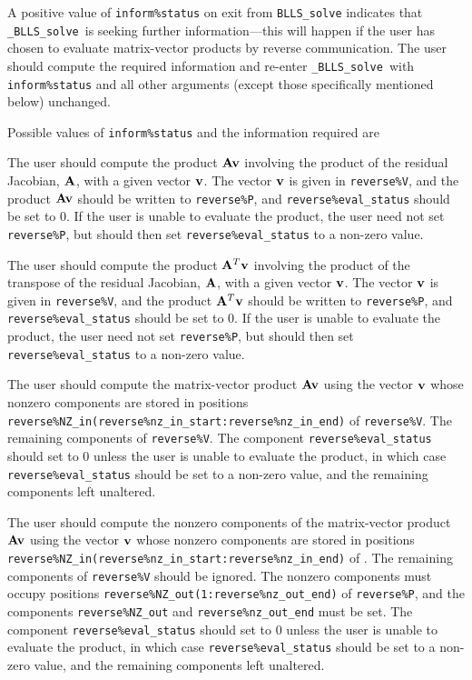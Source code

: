 \documentclass{galahad}
\newcommand{\packagename}{BLLS}
\newcommand{\fullpackagename}{\libraryname\_\packagename}
\newcommand{\solver}{{\tt \fullpackagename\_solve}}
\begin{document}
A positive value of {\tt inform\%status} on exit from
{\tt \packagename\_solve}
indicates that
\solver\ is seeking further information---this will happen
if the user has chosen to evaluate matrix-vector products by
reverse communication.
The user should compute the required information and re-enter \solver\
with {\tt inform\%status} and all other arguments (except those specifically
mentioned below) unchanged.

Possible values of {\tt inform\%status} and the information required are
\begin{description}

 The user should compute the product ${\mathbf{A}} {\mathbf{v}}$
     involving the product of the residual Jacobian, ${\mathbf{A}}$,
     with a given vector ${\mathbf{v}}$.
     The vector ${\mathbf{v}}$ is given in {\tt reverse\%V}, and the
     product ${\mathbf{A}} {\mathbf{v}}$ should be written to {\tt reverse\%P},
     and  {\tt reverse\%eval\_status} should be set to 0.
     If the user is unable to evaluate the product,
     the user need not set {\tt reverse\%P}, but
     should then set {\tt reverse\%eval\_status} to a non-zero value.

 The user should compute the product ${\mathbf{A}}^T {\mathbf{v}}$
     involving the product of the transpose of the residual
     Jacobian, ${\mathbf{A}}$,  with a given vector ${\mathbf{v}}$.
     The vector ${\mathbf{v}}$ is given in {\tt reverse\%V}, and the
     product ${\mathbf{A}}^T {\mathbf{v}}$ should be written to {\tt reverse\%P},
     and  {\tt reverse\%eval\_status} should be set to 0.
     If the user is unable to evaluate the product,
     the user need not set {\tt reverse\%P}, but
     should then set {\tt reverse\%eval\_status} to a non-zero value.

 The user should compute the matrix-vector product ${\mathbf{A}} {\mathbf{v}}$
     using the vector ${\mathbf{v}}$ whose nonzero components are stored in positions
     {\tt reverse\%NZ\_in(reverse\%nz\_in\_start:reverse\%nz\_in\_end)}
     of {\tt reverse\%V}. The remaining components of
     {\tt reverse\%V}.
     The component {\tt reverse\%eval\_status} should set to 0 unless the
     user is unable to evaluate the product, in which case
     {\tt reverse\%eval\_status} should be set to a non-zero value, and the
     remaining components left unaltered.

 The user should compute the nonzero components of the
     matrix-vector product ${\mathbf{A}} {\mathbf{v}}$ using the vector ${\mathbf{v}}$ whose
     nonzero components are stored in positions
     {\tt reverse\%NZ\_in(reverse\%nz\_in\_start:reverse\%nz\_in\_end)}
     of \linebreak {\tt reverse\%V}. The remaining components of
     {\tt reverse\%V} should be ignored. The nonzero components must
     occupy positions
     {\tt reverse\%NZ\_out(1:reverse\%nz\_out\_end)} of {\tt reverse\%P},
     and the components
     {\tt reverse\%NZ\_out} and {\tt reverse\%nz\_out\_end} must be set.
     The component {\tt reverse\%eval\_status} should set to 0 unless the
     user is unable to evaluate the product, in which case
     {\tt reverse\%eval\_status} should be set to a non-zero value, and the
      remaining components left unaltered.


\end{description}
\end{document}
